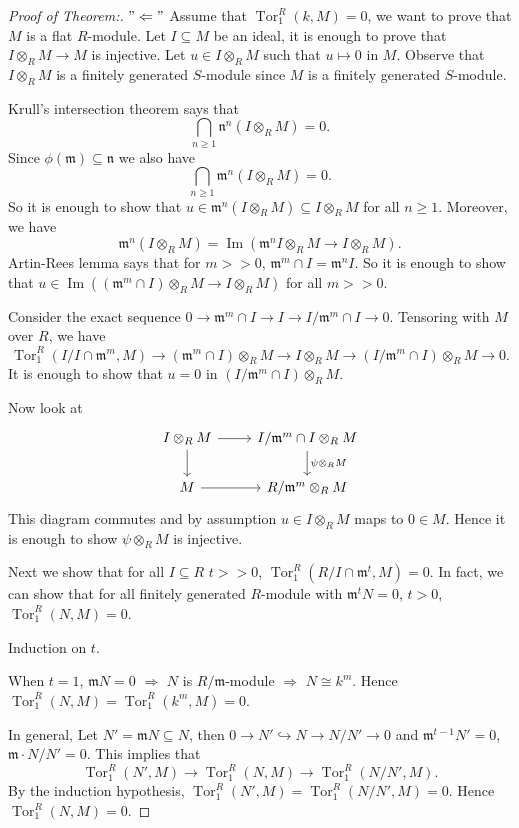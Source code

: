 \documentclass[cs4size]{article}
\newcommand{\su}{\subseteq}
\newcommand{\frm}{\mathfrak{m}}
\newcommand{\frn}{\mathfrak{n}}
\newcommand{\ra}{\rightarrow}
\newcommand{\Ra}{\Rightarrow}
\DeclareMathOperator{\Tor}{Tor}
\DeclareMathOperator{\Image}{Im}
\begin{document}
\begin{proof}[Proof of Theorem:]
$"\Leftarrow"$ Assume that $\Tor_1^R(k,M)=0$, we want to prove that $M$ is a flat $R$-module. Let $I\su M$ be an ideal, it is enough to prove that $I\otimes_RM\ra M$ is injective. Let $u\in I\otimes_RM$ such that $u\mapsto 0$ in $M$. Observe that $I\otimes_RM$ is a finitely generated $S$-module since $M$ is a finitely generated $S$-module.

Krull's intersection theorem says that
\[\bigcap_{n\geq 1}\frn^n(I\otimes _RM)=0.\]
Since $\phi(\frm)\su\frn$ we also have
\[\bigcap_{n\geq 1}\frm^n(I\otimes _RM)=0.\]
So it is enough to show that $u\in \frm^n(I\otimes_RM)\su I\otimes_RM$ for all $n\geq 1$. Moreover, we have
\[\frm^n(I\otimes_RM)=\Image(\frm^nI\otimes_RM\ra I\otimes_RM).\]
Artin-Rees lemma says that for $m>>0$, $\frm^m\cap I=\frm^nI$. So it is enough to show that $u\in \Image((\frm^m\cap I)\otimes_RM\ra I\otimes_RM)$ for all $m>>0$.

Consider the exact sequence $0\ra \frm^m \cap I\ra I\ra I/\frm^m\cap I\ra 0$. Tensoring with $M$ over $R$, we have \[\Tor_1^R(I/I\cap\frm^m,M)\ra (\frm^m\cap I)\otimes_RM\ra I\otimes_RM\ra(I/\frm^m\cap I)\otimes_RM\ra 0.\]
It is enough to show that $u=0$ in $(I/\frm^m\cap I)\otimes_RM$.

Now look at
\[
\begin{tikzcd}
I\otimes_RM \arrow{r}\arrow{d}      &I/\frm^m\cap I\otimes_RM\arrow{d}{\psi\otimes_RM} \\
M\arrow{r}& R/\frm^m\otimes_RM
\end{tikzcd}
\]
This diagram commutes and by assumption $u\in I\otimes_RM$ maps to $0\in M$. Hence it is enough to show $\psi\otimes_RM$ is injective.

Next we show that for all $I\su R$ $t>>0$, $\Tor_1^R(R/I\cap \frm^t,M)=0$. In fact, we can show that for all finitely generated $R$-module with $\frm^tN=0$, $t>0$, $\Tor_1^R(N,M)=0$.

Induction on $t$.

When $t=1$, $\frm N=0$ $\Ra$ $N$ is $R/\frm$-module $\Ra$ $N\cong k^m$. Hence $\Tor_1^R(N,M)=\Tor_1^R(k^m,M)=0$.

In general, Let $N'=\frm N\su N$, then $0\ra N'\hookrightarrow N\ra N/N'\ra 0$ and $\frm^{t-1}N'=0$, $\frm\cdot N/N'=0$. This implies that \[\Tor_1^R(N',M)\ra \Tor_1^R(N,M)\ra \Tor_1^R(N/N',M).\] By the induction hypothesis, $\Tor_1^R(N',M)=\Tor_1^R(N/N',M)=0$. Hence $\Tor_1^R(N,M)=0$.
\end{proof}
\end{document}
